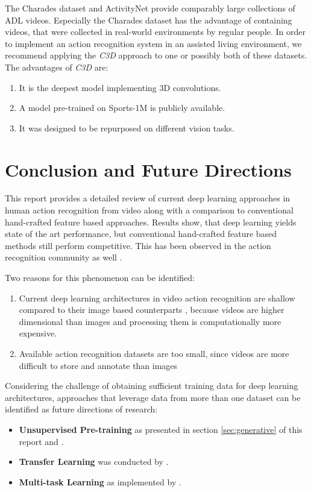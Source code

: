 The Charades dataset \cite{sigurdsson_hollywood_2016} and ActivityNet \cite{caba_heilbron_activitynet:_2015} provide comparably large collections of ADL videos.
Especially the Charades dataset has the advantage of containing videos, that were collected in real-world environments by regular people.
In order to implement an action recognition system in an assisted living environment, we recommend applying the \textit{C3D} approach \cite{tran_learning_2015} to one or possibly both of these datasets.
The advantages of \textit{C3D} are:
\begin{enumerate}
    \item It is the deepest model implementing 3D convolutions.
    \item A model pre-trained on Sports-1M is publicly available.
    \item It was designed to be repurposed on different vision tasks.
\end{enumerate}

\newpage
\section{Conclusion and Future Directions}
This report provides a detailed review of current deep learning approaches in human action recognition from video along with a comparison to conventional hand-crafted feature based approaches.
Results show, that deep learning yields state of the art performance, but conventional hand-crafted feature based methods still perform competitive.
This has been observed in the action recognition community as well \cite{varol_long-term_2016}.

Two reasons for this phenomenon can be identified:
\begin{enumerate}
    \item Current deep learning architectures in video action recognition are shallow compared to their image based counterparts \cite{wang_towards_2015}, because videos are higher dimensional than images and processing them is computationally more expensive.
    \item Available action recognition datasets are too small, since videos are more difficult to store and annotate than images \cite{karpathy_large-scale_2014}\cite{simonyan_two-stream_2014}\cite{wang_towards_2015}
\end{enumerate}

Considering the challenge of obtaining sufficient training data for deep learning architectures, approaches that leverage data from more than one dataset can be identified as future directions of research:
\begin{itemize}
    \item \textbf{Unsupervised Pre-training} as presented in section \ref{sec:generative} of this report and \textcite{varol_long-term_2016}.
    \item \textbf{Transfer Learning} was conducted by \textcite{karpathy_large-scale_2014}.
    \item \textbf{Multi-task Learning} as implemented by \textcite{simonyan_two-stream_2014}.
\end{itemize}

